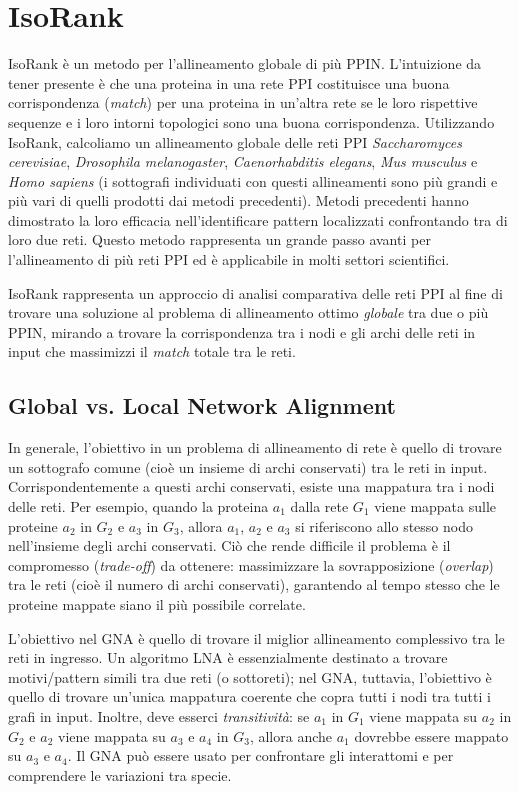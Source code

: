 \documentclass[11pt]{article}
\begin{document}
\pagebreak
\section{IsoRank}
IsoRank è un metodo per l'allineamento globale di più PPIN. L'intuizione da tener presente è che una proteina in una rete PPI costituisce una buona corrispondenza (\textit{match}) per una proteina in un'altra rete se le loro rispettive sequenze e i loro intorni topologici sono una buona corrispondenza. Utilizzando IsoRank, calcoliamo un allineamento globale delle reti PPI \textit{Saccharomyces cerevisiae}, \textit{Drosophila melanogaster}, \textit{Caenorhabditis elegans}, \textit{Mus musculus} e \textit{Homo sapiens} (i sottografi individuati con questi allineamenti sono più grandi e più vari di quelli prodotti dai metodi precedenti). Metodi precedenti hanno dimostrato la loro efficacia nell'identificare pattern localizzati confrontando tra di loro due reti. Questo metodo rappresenta un grande passo avanti per l'allineamento di più reti PPI ed è applicabile in molti settori scientifici.

IsoRank rappresenta un approccio di analisi comparativa delle reti PPI al fine di trovare una soluzione al problema di allineamento ottimo \textit{globale} tra due o più PPIN, mirando a trovare la corrispondenza tra i nodi e gli archi delle reti in input che massimizzi il \textit{match} totale tra le reti.

\subsection{Global vs. Local Network Alignment}
In generale, l'obiettivo in un problema di allineamento di rete è quello di trovare un sottografo comune (cioè un insieme di archi conservati) tra le reti in input. Corrispondentemente a questi archi conservati, esiste una mappatura tra i nodi delle reti. Per esempio, quando la proteina $a_1$ dalla rete $G_1$ viene mappata sulle proteine $a_2$ in $G_2$ e $a_3$ in $G_3$, allora $a_1$, $a_2$ e $a_3$ si riferiscono allo stesso nodo nell'insieme degli archi conservati. Ciò che rende difficile il problema è il compromesso (\textit{trade-off}) da ottenere: massimizzare la sovrapposizione (\textit{overlap}) tra le reti (cioè il numero di archi conservati), garantendo al tempo stesso che le proteine mappate siano il più possibile correlate.

L'obiettivo nel GNA è quello di trovare il miglior allineamento complessivo tra le reti in ingresso. Un algoritmo LNA è essenzialmente destinato a trovare motivi/pattern simili tra due reti (o sottoreti); nel GNA, tuttavia, l'obiettivo è quello di trovare un'unica mappatura coerente che copra tutti i nodi tra tutti i grafi in input. Inoltre, deve esserci \textit{transitività}: se $a_1$ in $G_1$ viene mappata su $a_2$ in $G_2$ e $a_2$ viene mappata su $a_3$ e $a_4$ in $G_3$, allora anche $a_1$ dovrebbe essere mappato su $a_3$ e $a_4$. Il GNA può essere usato per confrontare gli interattomi e per comprendere le variazioni tra specie.
\end{document}
